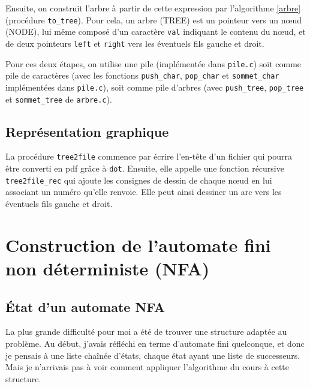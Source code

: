 \documentclass[12pt, a4paper]{article}
\begin{document}
Ensuite, on construit l'arbre à partir de cette expression par l'algorithme \ref{arbre} (procédure \texttt{to\_tree}). Pour cela, un arbre (TREE) est un pointeur vers un nœud (NODE), lui même composé d'un caractère \texttt{val} indiquant le contenu du nœud, et de deux pointeurs \texttt{left} et \texttt{right} vers les éventuels fils gauche et droit. 

Pour ces deux étapes, on utilise une pile (implémentée dans \texttt{pile.c}) soit comme pile de caractères (avec les fonctions \texttt{push\_char}, \texttt{pop\_char} et \texttt{sommet\_char} implémentées dans \texttt{pile.c}), soit comme pile d'arbres (avec \texttt{push\_tree}, \texttt{pop\_tree} et \texttt{sommet\_tree} de \texttt{arbre.c}).

\subsection{Représentation graphique}

La procédure \texttt{tree2file} commence par écrire l'en-tête d'un fichier qui pourra être converti en pdf grâce à \texttt{dot}. Ensuite, elle appelle une fonction récursive \texttt{tree2file\_rec} qui ajoute les consignes de dessin de chaque nœud en lui associant un numéro qu'elle renvoie. Elle peut ainsi dessiner un arc vers les éventuels fils gauche et droit.


\section{Construction de l'automate fini non déterministe (NFA)}

\subsection{État d'un automate NFA}

La plus grande difficulté pour moi a été de trouver une structure adaptée au problème. Au début, j'avais réfléchi en terme d'automate fini quelconque, et donc je pensais à une liste chaînée d'états, chaque état ayant une liste de successeurs. Mais je n'arrivais pas à voir comment appliquer l'algorithme du cours à cette structure.
\end{document}
